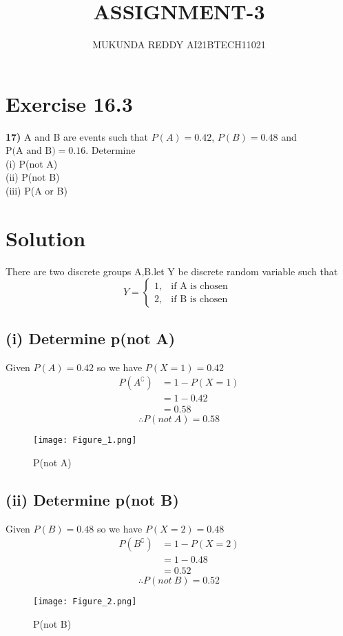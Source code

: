 \documentclass[journal,12pt,twocolumn]{article}
\begin{document}
\title{ASSIGNMENT-3}
\author{MUKUNDA REDDY AI21BTECH11021}
\date{}
\maketitle
\section*{Exercise 16.3}
\textbf{17)} A and B are events such that ${P(A) = 0.42}$,
${P(B) = 0.48}$ and ${\text{P(A and B)} = 0.16}$. Determine\\
(i)   P(not A)\\
(ii)  P(not B) \\
(iii) P(A or B) \\   
\hline
\section*{Solution}
There are two discrete groups A,B.let
Y be discrete random variable such that
\[ 
    Y = 
\begin{cases}
    1, & \text{if A is chosen  } \\
    2, & \text{if B is chosen  }
\end{cases} 
\]
\subsection*{(i) Determine p(not A)}
Given $P(A) = 0.42$ so we have
${P(X=1) = 0.42}$
\begin{align*}
    P(A^\complement) &= 1 - P(X=1)\\ 
                    &= 1 - 0.42\\   
                    &= 0.58 
\end{align*}
\begin{equation}
 \therefore P(not\ A) = 0.58    
\end{equation}

\begin{figure}[H]
    \centering
    \texttt{[image: Figure\_1.png]}
    \caption{P(not A)}
    \label{fig:1}
\end{figure}


\subsection*{(ii) Determine p(not B)}
Given $P(B) = 0.48$ so we have
${P(X=2) = 0.48}$
\begin{align*}
    P(B^\complement) &= 1 - P(X=2)\\ 
                    &= 1 - 0.48\\   
                    &= 0.52
\end{align*}
\begin{equation}
 \therefore P(not\ B) = 0.52   
\end{equation}
\begin{figure}[H]
    \centering
    \texttt{[image: Figure\_2.png]}
    \caption{P(not B)}
    \label{fig:2}
\end{figure}
\end{document}
